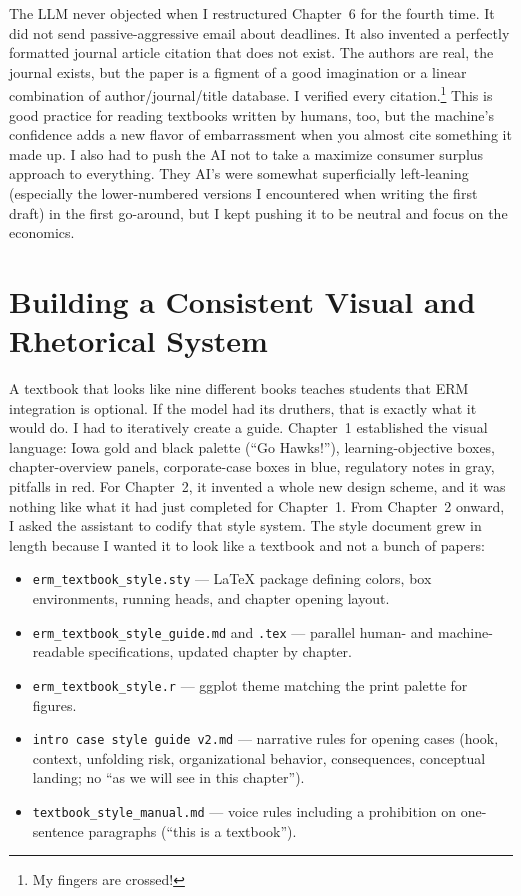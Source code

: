 \documentclass[11pt,letterpaper]{article}
\begin{document}
The LLM never objected when I restructured Chapter~6 for the fourth time. It did not send passive-aggressive email about deadlines. It also invented a perfectly formatted journal article citation that does not exist. The authors are real, the journal exists, but the paper is a figment of a good imagination or a linear combination of author/journal/title database. I verified every citation.\footnote{My fingers are crossed!} This is good practice for reading textbooks written by humans, too, but the machine's confidence adds a new flavor of embarrassment when you almost cite something it made up. I also had to push the AI not to take a maximize consumer surplus approach to everything. They AI's were somewhat superficially left-leaning (especially the lower-numbered versions I encountered when writing the first draft) in the first go-around, but I kept pushing it to be neutral and focus on the economics.

\section{Building a Consistent Visual and Rhetorical System}

A textbook that looks like nine different books teaches students that ERM integration is optional. If the model had its druthers, that is exactly what it would do. I had to iteratively create a guide. Chapter~1 established the visual language: Iowa gold and black palette (``Go Hawks!''), learning-objective boxes, chapter-overview panels, corporate-case boxes in blue, regulatory notes in gray, pitfalls in red. For Chapter~2, it invented a whole new design scheme, and it was nothing like what it had just completed for Chapter~1. From Chapter~2 onward, I asked the assistant to codify that style system. The style document grew in length because I wanted it to look like a textbook and not a bunch of papers:

\begin{itemize}[leftmargin=*, nosep]
  \item \texttt{erm\_textbook\_style.sty} --- LaTeX package defining colors, box environments, running heads, and chapter opening layout.
  \item \texttt{erm\_textbook\_style\_guide.md} and \texttt{.tex} --- parallel human- and machine-readable specifications, updated chapter by chapter.
  \item \texttt{erm\_textbook\_style.r} --- ggplot theme matching the print palette for figures.
  \item \texttt{intro case style guide v2.md} --- narrative rules for opening cases (hook, context, unfolding risk, organizational behavior, consequences, conceptual landing; no ``as we will see in this chapter'').
  \item \texttt{textbook\_style\_manual.md} --- voice rules including a prohibition on one-sentence paragraphs (``this is a textbook'').
\end{itemize}
\end{document}

